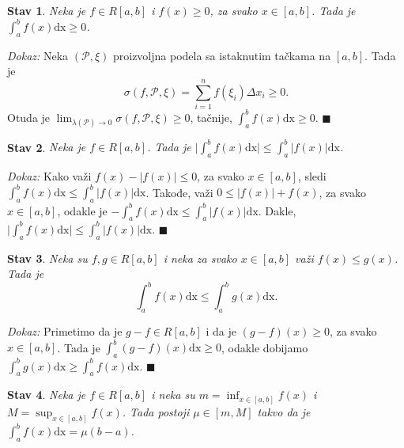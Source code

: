 \documentclass{article}
\newtheorem{stav}{Stav}[section]
\begin{document}
\begin{stavbox}
    \begin{stav}
        Neka je $f \in R[a,b]$ i $f(x) \geq 0$, za svako $x \in [a,b]$. Tada je $\displaystyle \int^b_a f(x)\text{dx} \geq 0$.
    \end{stav}
\end{stavbox}
\textit{Dokaz:} Neka $(\mathcal{P}, \xi)$ proizvoljna podela sa istaknutim tačkama na
$[a, b]$. Tada je
$$\sigma(f, \mathcal{P}, \xi) = \displaystyle \sum^n_{i=1}f(\xi_i)\Delta x_i \geq 0.$$
Otuda je $\displaystyle \lim_{\lambda(\mathcal{P})\longrightarrow 0} \sigma (f, \mathcal{P}, \xi) \geq 0$, tačnije, $\displaystyle \int^b_a f(x)\text{dx} \geq 0$.
\null\hfill $\blacksquare$\par
\begin{stavbox}
    \begin{stav}
        Neka je $f \in R[a, b]$. Tada je $\displaystyle \bigg|\int^b_a f(x)\text{dx}\bigg| \leq \int^b_a\big|f(x)\big|\text{dx}$.
    \end{stav}
\end{stavbox}
\textit{Dokaz:} Kako važi $f(x) - |f(x)| \leq 0$, za svako $x\in [a, b]$, sledi $\displaystyle \int^b_a f(x)\text{dx} \leq \int^b_a |f(x)|\text{dx}$.
Takođe, važi $0\leq|f(x)| + f(x)$, za svako $x\in [a, b]$, odakle je $\displaystyle -\int^b_a f(x)\text{dx} \leq \int^b_a |f(x)|\text{dx}$.
Dakle, $\displaystyle \bigg|\int^b_a f(x)\text{dx}\bigg| \leq \int^b_a\big|f(x)\big|\text{dx}$.
\null\hfill $\blacksquare$\par
\begin{stavbox}
    \begin{stav}
        Neka su $f, g \in R[a,b]$ i neka za svako $x \in [a, b]$ važi $f(x) \leq g(x)$. Tada je $$\displaystyle \int^b_a f(x) \text{dx} \leq \int^b_a g(x)\text{dx}.$$
    \end{stav}
\end{stavbox}
\textit{Dokaz:} Primetimo da je $g-f \in R[a, b]$ i da je $(g-f)(x) \geq 0$, za svako $x\in[a,b]$. Tada je $\displaystyle \int^b_a (g-f)(x)\text{dx} \geq 0$, odakle dobijamo $\displaystyle \int^b_a g(x)\text{dx} \geq  \int^b_a f(x)\text{dx} $.
\null\hfill $\blacksquare$\par
\begin{stavbox}
    \begin{stav}
        Neka je $f \in R[a, b]$ i neka su $\displaystyle m = \inf_{x\in [a, b]} f(x)$ i $\displaystyle M = \sup_{x \in [a,b]} f(x)$. Tada postoji $\mu \in [m, M]$ takvo da je $\displaystyle \int^b_a f(x) \text{dx} = \mu(b-a)$.
    \end{stav}
\end{stavbox}
\end{document}
